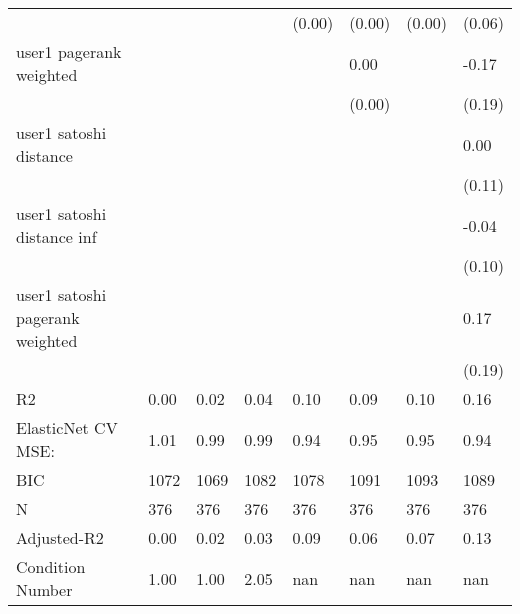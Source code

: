 \begin{table*}
\begin{center}
\begin{tabular}{llllllll}
                                               &          &            &         & (0.00)  & (0.00)   & (0.00)             & (0.06)    \\
user1 pagerank weighted                        &          &            &         &         & 0.00     &                    & -0.17     \\
                                               &          &            &         &         & (0.00)   &                    & (0.19)    \\
user1 satoshi distance                         &          &            &         &         &          &                    & 0.00      \\
                                               &          &            &         &         &          &                    & (0.11)    \\
user1 satoshi distance inf                     &          &            &         &         &          &                    & -0.04     \\
                                               &          &            &         &         &          &                    & (0.10)    \\
user1 satoshi pagerank weighted                &          &            &         &         &          &                    & 0.17      \\
                                               &          &            &         &         &          &                    & (0.19)    \\
R2                                             & 0.00     & 0.02       & 0.04    & 0.10    & 0.09     & 0.10               & 0.16      \\
ElasticNet CV MSE:                             & 1.01     & 0.99       & 0.99    & 0.94    & 0.95     & 0.95               & 0.94      \\
BIC                                            & 1072     & 1069       & 1082    & 1078    & 1091     & 1093               & 1089      \\
N                                              & 376      & 376        & 376     & 376     & 376      & 376                & 376       \\
Adjusted-R2                                    & 0.00     & 0.02       & 0.03    & 0.09    & 0.06     & 0.07               & 0.13      \\
Condition Number                               & 1.00     & 1.00       & 2.05    & nan     & nan      & nan                & nan       \\
\hline
\end{tabular}
\end{center}
\end{table*}